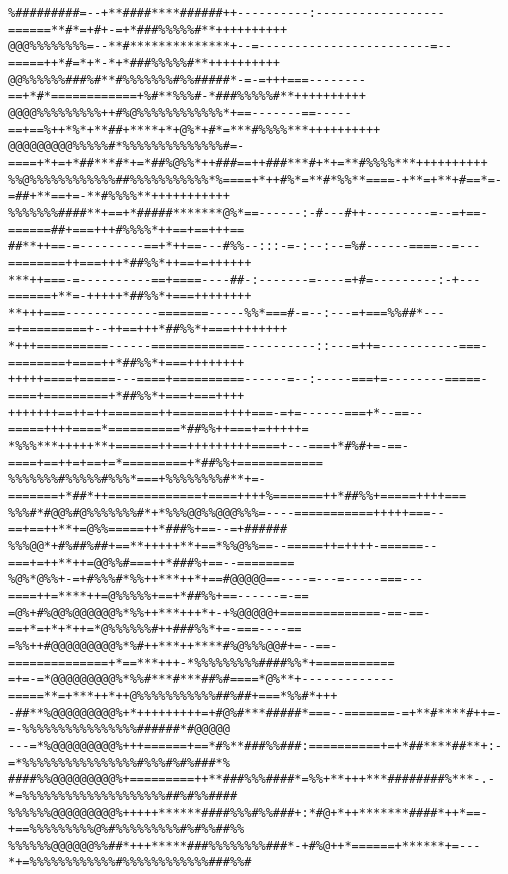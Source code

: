 \documentclass[a4paper, 12pt, oneside]{article}
\begin{document}
\begin{verbatim}
%#########=--+**####****######++----------:------------------======**#*=+#+-=+*###%%%%%#**++++++++++
@@@%%%%%%%%=--**#**************+--=------------------------=--=====++*#=*+*-*+*###%%%%%#**++++++++++
@@%%%%%%###%#**#%%%%%%%#%%#####*-=-=+++===--------==+*#*============+%#**%%%#-*###%%%%%#**++++++++++
@@@@%%%%%%%%%++#%@%%%%%%%%%%%%*+==-------==-----==+==%++*%*+**##+****+*+@%*+#*=***#%%%%***++++++++++
@@@@@@@@@%%%%%#*%%%%%%%%%%%%%%#=-====+*+=+*##***#*+=*##%@%%*++###==++###***#+*+=**#%%%%***++++++++++
%%@%%%%%%%%%%%%##%%%%%%%%%%%*%====+*++#%*=**#*%%**====-+**=+**+#==*=-=##+**==+=-**#%%%%**+++++++++++
%%%%%%%####**+==+*#####*******@%*==------:-#---#++---------=--=+==-======##+===+++#%%%%*++==+==+++==
##**++==-=---------==+*++==---#%%--:::-=-:--:--=%#------====--=---========++===+++*##%%*++==+=++++++
***++===-=----------==+====----##-:-------=----=+#=---------:-+---======+**=-+++++*##%%*+===++++++++
**+++===-------------=======-----%%*===#-=--:---=+===%%##*---=+=========+--++==+++*##%%*+===++++++++
*+++==========------=============----------::---=++=-----------===-========+====++*##%%*+===++++++++
+++++====+=====---====+==========------=--:-----===+=--------=====-====+=========+*##%%*+===+===++++
+++++++==++=++=======++=======++++===-=+=------===+*--==--=====++++====*==========*##%%++===+=+++++=
*%%%***+++++**+======++==+++++++++====+---===+*#%#+=-==-====+==++=+==+=*=========+*##%%+============
%%%%%%%#%%%%%#%%%*===+%%%%%%%%#**+=-=======+*##*++=============+====++++%=======++*##%%+=====++++===
%%%#*#@@%#@%%%%%%%#*+*%%%@@%%@@@%%%=----===========+++++===--==+==++**+=@%%=====++*###%+==--=+######
%%%@@*+#%##%##+==**+++++**+==*%%@%%==--=====++=++++-======--===+=++**++=@@%%#===++*###%+==--========
%@%*@%%+-=+#%%%#*%%++***++*+==#@@@@@==----=---=-----===---====++=****++=@%%%%%+==+*##%%+==------=-==
=@%+#%@@%@@@@@@%*%%++***+++*+-+%@@@@@+==============-==-==-==+*=+*+*++=*@%%%%%%#++###%%*+=-===----==
=%%++#@@@@@@@@@%*%#++***++****#%@%%%@@#+=--==-==============+*==***+++-*%%%%%%%%%####%%*+===========
=+=-=*@@@@@@@@@%*%%#***#***##%#====*@%**+-------------=====**=+***++*++@%%%%%%%%%%%##%##+===*%%#*+++
-##**%@@@@@@@@@%+*+++++++++=+#@%#***#####*===--=======-=+**#****#++=-=-%%%%%%%%%%%%%%%%######*#@@@@@
---=*%@@@@@@@@@%+++======+==*#%**###%%###:==========+=+*##****##**+:-=*%%%%%%%%%%%%%%%%#%%%#%#%###*%
####%%@@@@@@@@@%+=========++**###%%%####*=%%+**+++***########%***-.-*=%%%%%%%%%%%%%%%%%%%%##%#%%####
%%%%%%@@@@@@@@@%+++++******####%%%#%%###+:*#@+*++*******####*++*==-+==%%%%%%%%%@%#%%%%%%%%%#%#%%##%%
%%%%%%@@@@@@%%##*+++*****###%%%%%%%%###*-+#%@++*======+******+=---*+=%%%%%%%%%%%%#%%%%%%%%%%%%###%%#

\end{verbatim}
\end{document}
